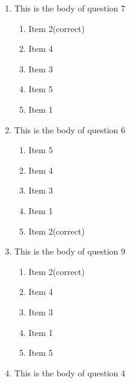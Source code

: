 \documentclass[amsfonts,bezier,leqno,fleqn,12pt,a4paper]{article}
\begin{document}
{{{\begin{large}
\begin{enumerate}
\begin{enumerate}
\item  Item 5
\item  Item 4
\item  Item 2\hfill {\small (correct)}
\item  Item 3
\item  Item 1

\end{enumerate}
\newpage


\item This is the body of question 7
\vspace {0.3in}
\setcounter{equation}{0}

\begin{enumerate}
\item  Item 2\hfill {\small (correct)}
\item  Item 4
\item  Item 3
\item  Item 5
\item  Item 1

\end{enumerate}

\vspace {3.5cm}


\item This is the body of question 6
\vspace {0.3in}
\setcounter{equation}{0}

\begin{enumerate}
\item  Item 5
\item  Item 4
\item  Item 3
\item  Item 1
\item  Item 2\hfill {\small (correct)}

\end{enumerate}
\newpage


\item This is the body of question 9
\vspace {0.3in}
\setcounter{equation}{0}

\begin{enumerate}
\item  Item 2\hfill {\small (correct)}
\item  Item 4
\item  Item 3
\item  Item 1
\item  Item 5

\end{enumerate}

\vspace {3.5cm}


\item This is the body of question 4
\vspace {0.3in}
\setcounter{equation}{0}


\end{enumerate}
\end{large}}}}
\end{document}

